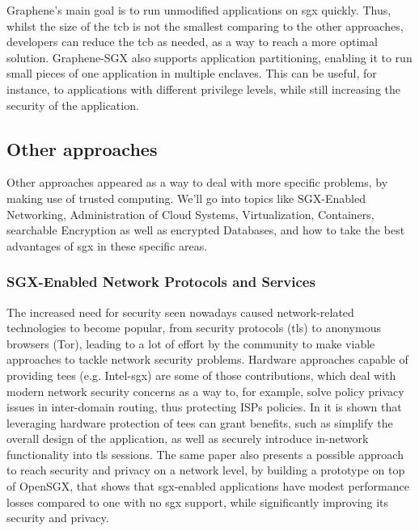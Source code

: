 Graphene's main goal is to run unmodified applications on \gls{sgx} quickly. Thus, whilst the size of the \gls{tcb} is not the smallest comparing to the other approaches, developers can reduce the \gls{tcb} as needed, as a way to reach a more optimal solution. 
Graphene-SGX also supports application partitioning, enabling it to run small pieces of one application in multiple enclaves. This can be useful, for instance, to applications with different privilege levels, while still increasing the security of the application.
\subsection{Other approaches}
\label{ssec:otherSGXFrameworks}



Other approaches appeared as a way to deal with more specific problems, by making use of trusted computing. We'll go into topics like SGX-Enabled Networking, Administration of Cloud Systems, Virtualization, Containers, searchable Encryption as well as encrypted Databases, and how to take the best advantages of \gls{sgx} in these specific areas. \newline


\subsubsection{SGX-Enabled Network Protocols and Services} 


The increased need for security seen nowadays caused network-related technologies to become popular, from security protocols (\gls{tls}) to anonymous browsers (Tor), leading to a lot of effort by the community to make viable approaches to tackle network security problems. 
Hardware approaches capable of providing \gls{tee}s (e.g. Intel-\gls{sgx}) are some of those contributions, which deal with modern network security concerns as a way to, for example, solve policy privacy issues in inter-domain routing, thus protecting ISPs policies.
In \cite{torSGXPaper} it is shown that leveraging hardware protection of \gls{tee}s can grant benefits, such as simplify the overall design of the application, as well as securely introduce in-network functionality into \gls{tls} sessions. The same paper also presents a possible approach to reach security and privacy on a network level, by building a prototype on top of OpenSGX, that shows that \gls{sgx}-enabled applications have modest performance losses compared to one with no \gls{sgx} support, while significantly improving its security and privacy.

